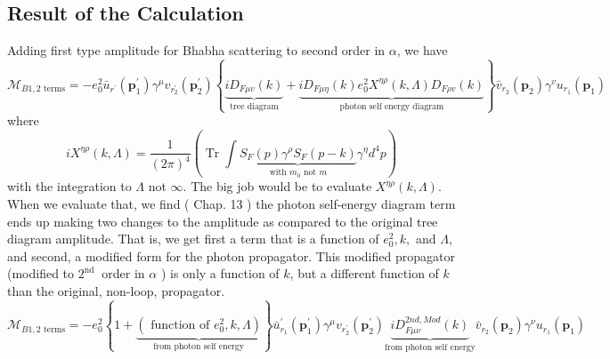 \subsection{Result of the Calculation}
Adding first type amplitude for Bhabha scattering to second order in $\alpha$, we have
\begin{equation}
\mathcal{M}_{B1,\text{2 terms}}=-e_{0}^{2} \bar{u}_{r^{\prime}}\left(\mathbf{p}_{1}^{\prime}\right) \gamma^{\mu} v_{r_{2}^{\prime}}\left(\mathbf{p}_{2}^{\prime}\right)\left\{\underbrace{i D_{F \mu v}(k)}_{\text{tree diagram}}+\underbrace{i D_{F \mu \eta}(k) e_{0}^{2} X^{\eta \rho}(k, \Lambda) D_{F \rho v}(k)}_{\text{photon self energy diagram}}\right\} \bar{v}_{r_{2}}\left(\mathbf{p}_{2}\right) \gamma^{v} u_{r_{1}}\left(\mathbf{p}_{1}\right)
\label{renorm-Bhabha-1st}
\end{equation}
where
$$iX^{\eta\rho}(k,\Lambda)=\frac{1}{(2 \pi)^{4}}\left(\operatorname{Tr} \int \underbrace{S_{F}(p) \gamma^{\rho} S_{F}(p-k)}_{\text {with } m_{0} \text { not } m} \gamma^{\eta} d^{4} p\right)$$
with the integration to $\Lambda$ not $\infty$. The big job would be to evaluate $X^{\eta \rho}(k, \Lambda)$. When we evaluate that, we find ( Chap. 13 ) the photon self-energy diagram term ends up making two changes to the amplitude as compared to the original tree diagram amplitude. That is, we get first a term that is a function of $e_{0}^{2}, k,$ and $\Lambda,$ and second, a modified form for the photon propagator. This modified propagator (modified to $2^{\text {nd }}$ order in $\alpha$ ) is only a function of $k$, but a different function of $k$ than the original, non-loop, propagator.
\begin{equation}
\mathcal{M}_{B1,\text{2 terms}}=-e_{0}^{2}\left\{1+\underbrace{\left(\text { function of } e_{0}^{2}, k, \Lambda\right)}_{\text{from photon self energy}}\right\} \bar{u}_{r_{1}}^{\prime}\left(\mathbf{p}_{1}^{\prime}\right) \gamma^{\mu} v_{r_{2}^{\prime}}\left(\mathbf{p}_{2}^{\prime}\right) \underbrace{i D_{F \mu \nu}^{2 n d,Mod}(k)}_{\text{from photon self energy}}  \bar{v}_{r_{2}}\left(\mathbf{p}_{2}\right) \gamma^{\nu} u_{r_{1}}\left(\mathbf{p}_{1}\right)
\label{renorm-Bhabha-1st-2}
\end{equation}

